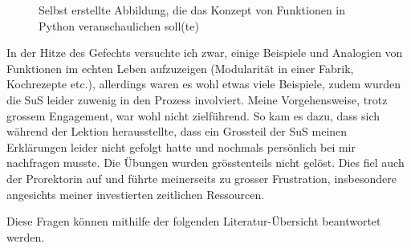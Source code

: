 \begin{myExBox}[title=Beispiel aus der eigenen Unterrichtserfahrung]
\begin{figure}[H]
\centering
{}
\caption*{Selbst erstellte Abbildung, die das Konzept von Funktionen in Python veranschaulichen soll(te)}
\end{figure}
In der Hitze des Gefechts versuchte ich zwar, einige Beispiele und Analogien von Funktionen im echten Leben aufzuzeigen (Modularität in einer Fabrik, Kochrezepte etc.), allerdings waren es wohl etwas viele Beispiele, zudem wurden die SuS leider zuwenig in den Prozess involviert. Meine Vorgehensweise, trotz grossem Engagement, war wohl nicht zielführend. So kam es dazu, dass sich während der Lektion herausstellte, dass ein Grossteil der SuS meinen Erklärungen leider nicht gefolgt hatte und nochmals persönlich bei mir nachfragen musste. Die Übungen wurden grösstenteils nicht gelöst. Dies fiel auch der Prorektorin auf und führte meinerseits zu grosser Frustration, insbesondere angesichts meiner investierten zeitlichen Ressourcen.

\begin{myExBox}[title=Diskussion]
\fragestellungen
Diese Fragen können mithilfe der folgenden Literatur-Übersicht beantwortet werden.
\end{myExBox}
\end{myExBox}
\newpage

